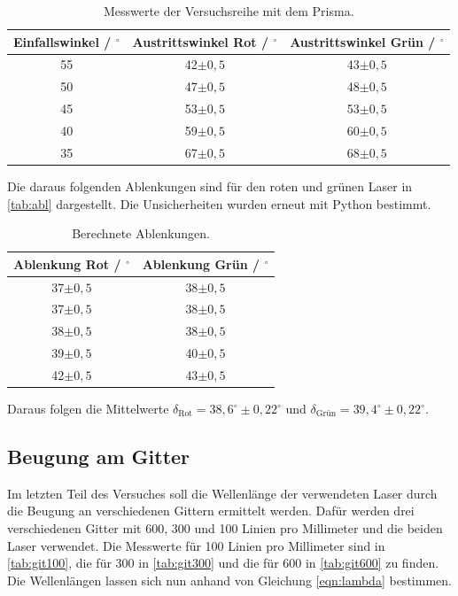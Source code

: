\begin{table}[H]
  \centering
  \caption{Messwerte der Versuchsreihe mit dem Prisma.}
  \label{tab:prisma}
  \begin{tabular}{c c c}
    \toprule
    Einfallswinkel / $^{\circ}$ & Austrittswinkel Rot / $^{\circ}$ & Austrittswinkel Grün / $^{\circ}$\\
    \midrule
    55 & 42$\pm 0,5$ & 43$\pm 0,5$\\
    50 & 47$\pm 0,5$ & 48$\pm 0,5$\\
    45 & 53$\pm 0,5$ & 53$\pm 0,5$\\
    40 & 59$\pm 0,5$ & 60$\pm 0,5$\\
    35 & 67$\pm 0,5$ & 68$\pm 0,5$\\
    \bottomrule
  \end{tabular}
\end{table}

\noindent
Die daraus folgenden Ablenkungen sind für den roten und grünen Laser in \autoref{tab:abl} dargestellt. Die Unsicherheiten wurden erneut mit Python bestimmt.

\begin{table}[H]
  \centering
  \caption{Berechnete Ablenkungen.}
  \label{tab:abl}
  \begin{tabular}{c c }
    \toprule
    Ablenkung Rot / $^{\circ}$ & Ablenkung Grün / $^{\circ}$\\
    \midrule
    37$\pm 0,5$ & 38$\pm 0,5$\\
    37$\pm 0,5$ & 38$\pm 0,5$\\
    38$\pm 0,5$ & 38$\pm 0,5$\\
    39$\pm 0,5$ & 40$\pm 0,5$\\
    42$\pm 0,5$ & 43$\pm 0,5$\\
    \bottomrule
  \end{tabular}
\end{table}

\noindent
Daraus folgen die Mittelwerte $\delta_\text{Rot} = 38,6^{\circ} \pm 0,22^{\circ}$ und $\delta_\text{Grün} = 39,4^{\circ} \pm 0,22^{\circ}$.

\subsection{Beugung am Gitter}

Im letzten Teil des Versuches soll die Wellenlänge der verwendeten Laser durch die Beugung an verschiedenen Gittern ermittelt werden. Dafür werden drei verschiedenen
Gitter mit 600, 300 und 100 Linien pro Millimeter und die beiden Laser verwendet. Die Messwerte für 100 Linien pro Millimeter sind in \autoref{tab:git100}, die
für 300 in \autoref{tab:git300} und die für 600 in \autoref{tab:git600} zu finden.
\newline
Die Wellenlängen lassen sich nun anhand von Gleichung \eqref{eqn:lambda} bestimmen.

